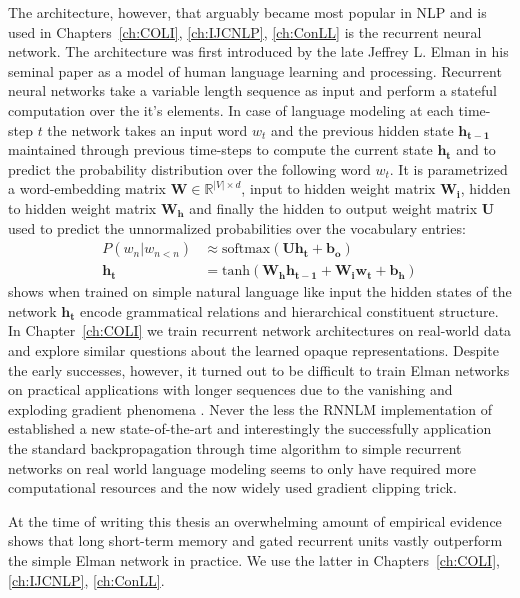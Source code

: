 The architecture, however, that arguably became most popular in NLP and is used in
Chapters~\ref{ch:COLI}, \ref{ch:IJCNLP}, \ref{ch:ConLL} is the recurrent neural network. The architecture was
first introduced by the late Jeffrey L. Elman in his seminal paper \citep{elman1990finding}
as a model of human language learning and processing. Recurrent neural networks
take a variable length sequence as input and perform a stateful computation over the it's elements.
In case of language modeling at each time-step $t$ the network takes an input word $w_t$
and the previous hidden state $\mathbf{h_{t-1}}$ maintained through previous time-steps to compute the current
state $\mathbf{h_t}$ and to predict the probability distribution over the following word $w_t$.
It is parametrized a word-embedding matrix $\mathbf{W} \in \mathbb{R}^{|V| \times d}$, input to hidden weight
matrix $\mathbf{W_i}$, hidden to hidden weight matrix $\mathbf{W_h}$ and finally the hidden to output
weight matrix $\mathbf{U}$ used to predict the unnormalized probabilities over the vocabulary entries:
\begin{align}
P(w_n|w_{n<n}) &\approx \text{softmax}(\mathbf{U} \mathbf{h_t} + \mathbf{b_o}) \\
\mathbf{h_t} &= \text{tanh}(\mathbf{W_h}\mathbf{h_{t-1}} + \mathbf{W_i}\mathbf{w_t} + \mathbf{b_h})
\end{align}
\cite{elman1991distributed} shows when trained on simple natural language like input the
hidden states of the network $\mathbf{h_t}$ encode grammatical relations and hierarchical
constituent structure. In Chapter~\ref{ch:COLI} we train recurrent network architectures
on real-world data and explore similar questions about the learned opaque representations.
Despite the early successes, however, it turned out to be difficult to train
Elman networks on practical applications with longer sequences
due to the vanishing and exploding gradient phenomena \citep{bengio1994learning}.
Never the less the RNNLM implementation of \cite{mikolov2010recurrent}
established a new state-of-the-art and interestingly the successfully
application the standard backpropagation through time algorithm  \citep{williams1995gradient}
to simple recurrent networks on real world language modeling \cite{mikolov2012statistical}
seems to only have required more computational resources and the now widely used gradient clipping trick.

At the time of writing this thesis an overwhelming amount of empirical evidence
shows that long short-term memory \citep{hochreiter1997long,gers1999learning}
and gated recurrent units \citep{cho2014learning}
vastly outperform the simple Elman network in practice. We use the latter in
Chapters~\ref{ch:COLI}, \ref{ch:IJCNLP}, \ref{ch:ConLL}.

